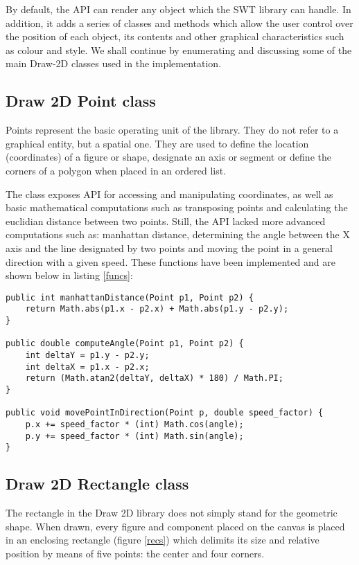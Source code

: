 By default, the API can render any object which the SWT library can handle. In addition, it adds a series of 
classes and methods which allow the user control over the position of each object, its contents and other 
graphical characteristics such as colour and style. We shall continue by enumerating and discussing some of 
the main Draw-2D classes used in the implementation.

\subsection{Draw 2D Point class}

Points represent the basic operating unit of the library. They do not refer to a graphical entity, but a 
spatial one. They are used to define the location (coordinates) of a figure or shape, designate an axis 
or segment or define the corners of a polygon when placed in an ordered list.

The class exposes API for accessing and manipulating coordinates, as well as basic mathematical computations 
such as transposing points and calculating the euclidian distance between two points. Still, the API lacked more 
advanced computations such as: manhattan distance, determining the angle between the X axis and the line 
designated by two points and moving the point in a general direction with a given speed. These functions 
have been implemented and are shown below in listing \ref{funcs}:

\begin{lstlisting}[caption={Functions added for the Point class}, language=Java \label{funcs}]
public int manhattanDistance(Point p1, Point p2) {
	return Math.abs(p1.x - p2.x) + Math.abs(p1.y - p2.y);
} 

public double computeAngle(Point p1, Point p2) {
	int deltaY = p1.y - p2.y;
	int deltaX = p1.x - p2.x;
	return (Math.atan2(deltaY, deltaX) * 180) / Math.PI;
}

public void movePointInDirection(Point p, double speed_factor) {
	p.x += speed_factor * (int) Math.cos(angle);
	p.y += speed_factor * (int) Math.sin(angle);
}

\end{lstlisting}

\subsection{Draw 2D Rectangle class}

The rectangle in the Draw 2D library does not simply stand for the geometric shape. When drawn, every 
figure and component placed on the canvas is placed in an enclosing rectangle (figure \ref{recs}) which delimits its size 
and relative position by means of five points: the center and four corners. 

